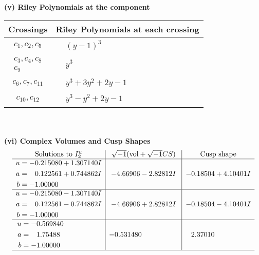 \documentclass[1p]{elsarticle_modified}
\theoremstyle{definition}
\newcommand{\I}{\sqrt{-1}}
\begin{document}
\newpage\renewcommand{\arraystretch}{1}
\flushleft \textbf{(v) Riley Polynomials at the component}\newline \\
\begin{tabular}{m{50pt}|m{274pt}}
Crossings & \hspace{64pt}Riley Polynomials at each crossing \\
\hline $$\begin{aligned}c_{1},c_{2},c_{5}\end{aligned}$$&$\begin{aligned}
&(y-1)^3
\end{aligned}$\\
\hline $$\begin{aligned}c_{3},c_{4},c_{8}\\c_{9}\end{aligned}$$&$\begin{aligned}
&y^3
\end{aligned}$\\
\hline $$\begin{aligned}c_{6},c_{7},c_{11}\end{aligned}$$&$\begin{aligned}
&y^3+3 y^2+2 y-1
\end{aligned}$\\
\hline $$\begin{aligned}c_{10},c_{12}\end{aligned}$$&$\begin{aligned}
&y^3- y^2+2 y-1
\end{aligned}$\\
\hline
\end{tabular}\\~\\
\newpage\flushleft \textbf{(vi) Complex Volumes and Cusp Shapes}
$$\begin{array}{c|c|c}  
\text{Solutions to }I^u_{2}& \I (\text{vol} + \sqrt{-1}CS) & \text{Cusp shape}\\
 \hline 
\begin{aligned}
u &= -0.215080 + 1.307140 I \\
a &= \phantom{-}0.122561 + 0.744862 I \\
b &= -1.00000\phantom{ +0.000000I}\end{aligned}
 & -4.66906 - 2.82812 I & -0.18504 + 4.10401 I \\ \hline\begin{aligned}
u &= -0.215080 - 1.307140 I \\
a &= \phantom{-}0.122561 - 0.744862 I \\
b &= -1.00000\phantom{ +0.000000I}\end{aligned}
 & -4.66906 + 2.82812 I & -0.18504 - 4.10401 I \\ \hline\begin{aligned}
u &= -0.569840\phantom{ +0.000000I} \\
a &= \phantom{-}1.75488\phantom{ +0.000000I} \\
b &= -1.00000\phantom{ +0.000000I}\end{aligned}
 & -0.531480\phantom{ +0.000000I} & \phantom{-}2.37010\phantom{ +0.000000I}\\
 \hline 
 \end{array}$$\newpage\newpage\renewcommand{\arraystretch}{1}
\end{document}
